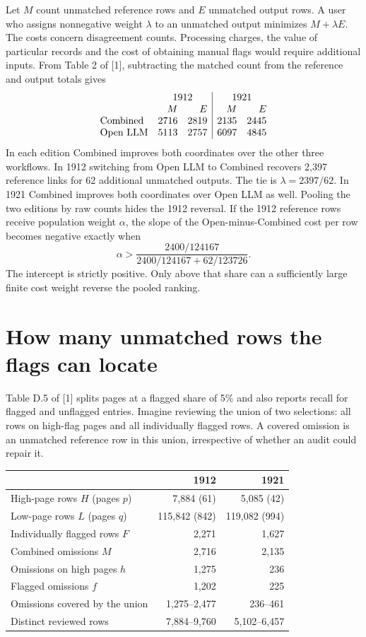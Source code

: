 \documentclass[11pt]{article}
\begin{document}
Let $M$ count unmatched reference rows and $E$ unmatched output rows. A user who assigns nonnegative weight $\lambda$ to an unmatched output minimizes $M+\lambda E$. The costs concern disagreement counts. Processing charges, the value of particular records and the cost of obtaining manual flags would require additional inputs. From Table 2 of [1], subtracting the matched count from the reference and output totals gives
\[
\begin{array}{lrr|rr}
&\multicolumn{2}{c|}{1912}&\multicolumn{2}{c}{1921}\\
& M & E & M & E\\
\text{Combined} &2716&2819&2135&2445\\
\text{Open LLM} &5113&2757&6097&4845
\end{array}
\]
In each edition Combined improves both coordinates over the other three workflows. In 1912 switching from Open LLM to Combined recovers 2,397 reference links for 62 additional unmatched outputs. The tie is $\lambda=2397/62$. In 1921 Combined improves both coordinates over Open LLM as well. Pooling the two editions by raw counts hides the 1912 reversal. If the 1912 reference rows receive population weight $\alpha$, the slope of the Open-minus-Combined cost per row becomes negative exactly when
\[
\alpha>\frac{2400/124167}{2400/124167+62/123726}.
\]
The intercept is strictly positive. Only above that share can a sufficiently large finite cost weight reverse the pooled ranking.

\newpage
\section*{How many unmatched rows the flags can locate}
Table D.5 of [1] splits pages at a flagged share of 5\% and also reports recall for flagged and unflagged entries. Imagine reviewing the union of two selections: all rows on high-flag pages and all individually flagged rows. A covered omission is an unmatched reference row in this union, irrespective of whether an audit could repair it.

\begin{center}\small
\begin{tabular}{lrr}
\toprule &1912&1921\\\midrule
High-page rows $H$ (pages $p$)&7,884 (61)&5,085 (42)\\
Low-page rows $L$ (pages $q$)&115,842 (842)&119,082 (994)\\
Individually flagged rows $F$&2,271&1,627\\
Combined omissions $M$&2,716&2,135\\
Omissions on high pages $h$&1,275&236\\
Flagged omissions $f$&1,202&225\\\midrule
Omissions covered by the union&1,275--2,477&236--461\\
Distinct reviewed rows&7,884--9,760&5,102--6,457\\
\bottomrule
\end{tabular}
\end{center}
\end{document}
